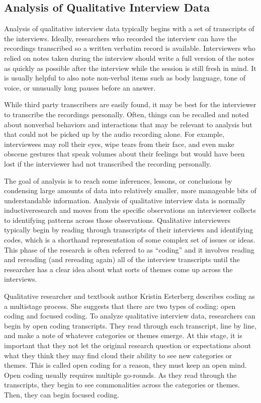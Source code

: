 \subsection{Analysis of Qualitative Interview Data}

Analysis of qualitative interview data typically begins with a set of transcripts of the interviews. Ideally, researchers who recorded the interview can have the recordings transcribed so a written verbatim record is available. Interviewers who relied on notes taken during the interview should write a full version of the notes as quickly as possible after the interview while the session is still fresh in mind. It is usually helpful to also note non-verbal items such as body language, tone of voice, or unusually long pauses before an answer.  

While third party transcribers are easily found, it may be best for the interviewer to transcribe the recordings personally. Often, things can be recalled and noted about nonverbal behaviors and interactions that may be relevant to analysis but that could not be picked up by the audio recording alone. For example, interviewees may roll their eyes, wipe tears from their face, and even make obscene gestures that speak volumes about their feelings but would have been lost if the interviewer had not transcribed the recording personally.

The goal of analysis is to reach some inferences, lessons, or conclusions by condensing large amounts of data into relatively smaller, more manageable bits of understandable information. Analysis of qualitative interview data is normally \gls{inductiveresearch} and moves from the specific observations an interviewer collects to identifying patterns across those observations. Qualitative interviewers typically begin by reading through transcripts of their interviews and identifying codes, which is a shorthand representation of some complex set of issues or ideas. This phase of the research is often referred to as ``coding'' and it involves reading and rereading (and rereading again) all of the interview transcripts until the researcher has a clear idea about what sorts of themes come up across the interviews.

Qualitative researcher and textbook author Kristin Esterberg \cite{esterberg2002qualitative} describes coding as a multistage process. She suggests that there are two types of coding: open coding and focused coding. To analyze qualitative interview data, researchers can begin by open coding transcripts. They read through each transcript, line by line, and make a note of whatever categories or themes emerge. At this stage, it is important that they not let the original research question or expectations about what they think they may find cloud their ability to see new categories or themes. This is called open coding for a reason, they must keep an open mind. Open coding usually requires multiple go-rounds. As they read through the transcripts, they begin to see commonalities across the categories or themes. Then, they can begin focused coding.

